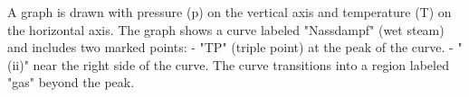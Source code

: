 A graph is drawn with pressure (p) on the vertical axis and temperature (T) on the horizontal axis. The graph shows a curve labeled "Nassdampf" (wet steam) and includes two marked points:  
- "TP" (triple point) at the peak of the curve.  
- "(ii)" near the right side of the curve.  
The curve transitions into a region labeled "gas" beyond the peak.